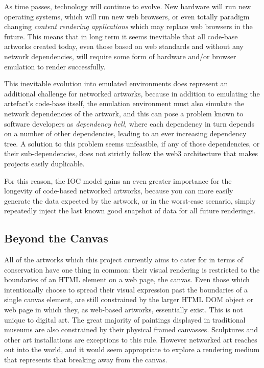 As time passes, technology will continue to evolve. New hardware will run new operating systems, which will run new web browsers, or even totally paradigm changing \emph{content rendering applications} which may replace web browsers in the future. This means that in long term it seems inevitable that all code-base artworks created today, even those based on web standards and without any network dependencies, will require some form of hardware and/or browser emulation to render successfully. 

This inevitable evolution into emulated environments does represent an additional challenge for networked artworks, because in addition to emulating the artefact's code-base itself, the emulation environment must also simulate the network dependencies of the artwork, and this can pose a problem known to software developers as \emph{dependency hell}, where each dependency in turn depends on a number of other dependencies, leading to an ever increasing dependency tree. A solution to this problem seems unfeasible, if any of those dependencies, or their sub-dependencies, does not strictly follow the web3 architecture that makes projects easily duplicable.

For this reason, the IOC model gains an even greater importance for the longevity of code-based networked artworks, because you can more easily generate the data expected by the artwork, or in the worst-case scenario, simply repeatedly inject the last known good snapshot of data for all future renderings.

\subsection{Beyond the Canvas}

All of the artworks which this project currently aims to cater for in terms of conservation have one thing in common: their visual rendering is restricted to the boundaries of an HTML element on a web page, the canvas. Even those which intentionally choose to spread their visual expression past the boundaries of a single canvas element, are still constrained by the larger HTML DOM object or web page in which they, as web-based artworks, essentially exist. This is not unique to digital art. The great majority of paintings displayed in traditional museums are also constrained by their physical framed canvasses. Sculptures and other art installations are exceptions to this rule. However networked art reaches out into the world, and it would seem appropriate to explore a rendering medium that represents that breaking away from the canvas.


